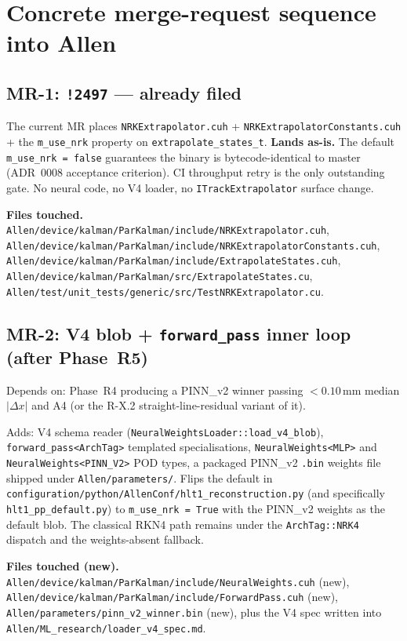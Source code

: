 \documentclass[11pt,a4paper]{article}
\newcommand{\code}[1]{\texttt{#1}}
\begin{document}
\section{Concrete merge-request sequence into Allen}
\label{sec:mrs}

\subsection{MR-1: \code{!2497} --- already filed}

The current MR places
\code{NRKExtrapolator.cuh} +
\code{NRKExtrapolatorConstants.cuh} +
the \code{m\_use\_nrk} property on \code{extrapolate\_states\_t}.
\textbf{Lands as-is.} The default \code{m\_use\_nrk = false} guarantees
the binary is bytecode-identical to master (ADR~0008 acceptance
criterion). CI throughput retry is the only outstanding gate. No
neural code, no V4 loader, no \code{ITrackExtrapolator} surface change.

\textbf{Files touched.}
\code{Allen/device/kalman/ParKalman/include/NRKExtrapolator.cuh},
\code{Allen/device/kalman/ParKalman/include/NRKExtrapolatorConstants.cuh},
\code{Allen/device/kalman/ParKalman/include/ExtrapolateStates.cuh},
\code{Allen/device/kalman/ParKalman/src/ExtrapolateStates.cu},
\code{Allen/test/unit\_tests/generic/src/TestNRKExtrapolator.cu}.

\subsection{MR-2: V4 blob + \code{forward\_pass} inner loop (after Phase~R5)}

Depends on: Phase~R4 producing a PINN\_v2 winner passing
$< 0.10$\,mm median $|\Delta x|$ and A4
(or the R-X.2 straight-line-residual variant of it).

Adds: V4 schema reader (\code{NeuralWeightsLoader::load\_v4\_blob}),
\code{forward\_pass<ArchTag>} templated specialisations,
\code{NeuralWeights<MLP>} and \code{NeuralWeights<PINN\_V2>} POD types,
a packaged PINN\_v2 \code{.bin} weights file shipped under
\code{Allen/parameters/}. Flips the default in
\code{configuration/python/AllenConf/hlt1\_reconstruction.py} (and
specifically \code{hlt1\_pp\_default.py}) to \code{m\_use\_nrk = True}
with the PINN\_v2 weights as the default blob. The classical RKN4 path
remains under the \code{ArchTag::NRK4} dispatch and the
weights-absent fallback.

\textbf{Files touched (new).}
\code{Allen/device/kalman/ParKalman/include/NeuralWeights.cuh} (new),
\code{Allen/device/kalman/ParKalman/include/ForwardPass.cuh} (new),
\code{Allen/parameters/pinn\_v2\_winner.bin} (new),
plus the V4 spec written into \code{Allen/ML\_research/loader\_v4\_spec.md}.
\end{document}

